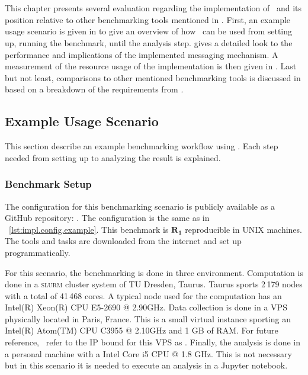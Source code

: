 \chapter{\chEvaluation}
\label{ch:evaluation}

This chapter presents several evaluation regarding the implementation of \OurBenchmarkingTool~and its position relative to other benchmarking tools mentioned in .
First, an example usage scenario is given in  to give an overview of how \OurBenchmarkingTool~can be used from setting up, running the benchmark, until the analysis step.
 gives a detailed look to the performance and implications of the implemented messaging mechanism.
A measurement of the resource usage of the implementation is then given in .
Last but not least, comparisons to other mentioned benchmarking tools is discussed in  based on a breakdown of the requirements from .

\section{Example Usage Scenario}
\label{sec:eval.scenario}

This section describe an example benchmarking workflow using \OurBenchmarkingTool.
Each step needed from setting up to analyzing the result is explained.

\subsection{Benchmark Setup}

The configuration for this benchmarking scenario is publicly available as a GitHub repository: \href{https://github.com/rkkautsar/benchmark-demo-sat}{}.
The configuration is the same as in \lst~\ref{lst:impl.config.example}.
This benchmark is \(\bm{R_1}\) reproducible in UNIX machines.
The tools and tasks are downloaded from the internet and set up programmatically.

For this scenario, the benchmarking is done in three environment.
Computation is done in a \textsc{slurm} cluster system of TU Dresden, Taurus.
Taurus sports 2\,179 nodes with a total of 41\,468 cores.
A typical node used for the computation has an Intel(R) Xeon(R) CPU E5-2690 @ 2.90GHz.
Data collection is done in a VPS physically located in Paris, France.
This is a small virtual instance sporting an Intel(R) Atom(TM) CPU C3955 @ 2.10GHz and 1 GB of RAM.
For future reference, \first~refer to the IP bound for this VPS as .
Finally, the analysis is done in a personal machine with a Intel Core i5 CPU @ 1.8 GHz.
This is not necessary but in this scenario it is needed to execute an analysis in a Jupyter notebook.

